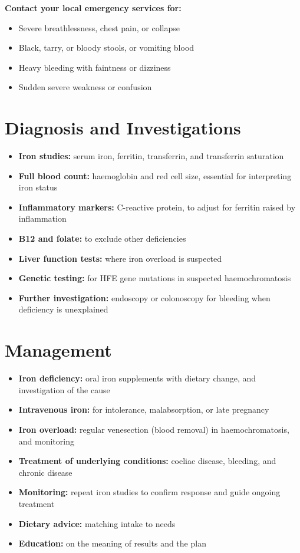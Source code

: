 \textbf{Contact your local emergency services for:}
\begin{itemize}
    \item Severe breathlessness, chest pain, or collapse
    \item Black, tarry, or bloody stools, or vomiting blood
    \item Heavy bleeding with faintness or dizziness
    \item Sudden severe weakness or confusion
\end{itemize}

\section*{Diagnosis and Investigations}
\begin{itemize}
    \item \textbf{Iron studies:} serum iron, ferritin, transferrin, and transferrin saturation
    \item \textbf{Full blood count:} haemoglobin and red cell size, essential for interpreting iron status
    \item \textbf{Inflammatory markers:} C-reactive protein, to adjust for ferritin raised by inflammation
    \item \textbf{B12 and folate:} to exclude other deficiencies
    \item \textbf{Liver function tests:} where iron overload is suspected
    \item \textbf{Genetic testing:} for HFE gene mutations in suspected haemochromatosis
    \item \textbf{Further investigation:} endoscopy or colonoscopy for bleeding when deficiency is unexplained
\end{itemize}

\section*{Management}
\begin{itemize}
    \item \textbf{Iron deficiency:} oral iron supplements with dietary change, and investigation of the cause
    \item \textbf{Intravenous iron:} for intolerance, malabsorption, or late pregnancy
    \item \textbf{Iron overload:} regular venesection (blood removal) in haemochromatosis, and monitoring
    \item \textbf{Treatment of underlying conditions:} coeliac disease, bleeding, and chronic disease
    \item \textbf{Monitoring:} repeat iron studies to confirm response and guide ongoing treatment
    \item \textbf{Dietary advice:} matching intake to needs
    \item \textbf{Education:} on the meaning of results and the plan
\end{itemize}


